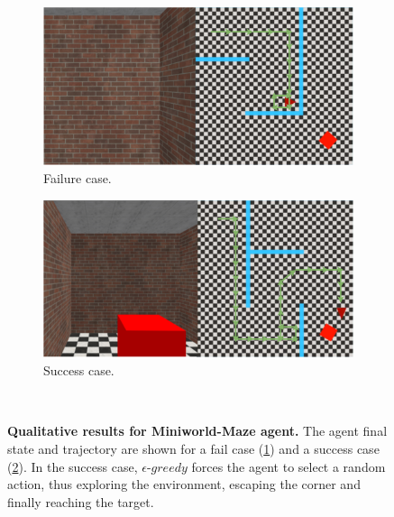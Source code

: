 \begin{figure}
    \centering
    \begin{subfigure}[b]{0.49\textwidth}
        \centering
        \includegraphics[width=\textwidth]{figures/understanding_vsn/qualitative_results/fail}
        \caption{Failure case.}
        \label{fig:maze_qualitative_fail}
    \end{subfigure}
    \hfill
    \begin{subfigure}[b]{0.49\textwidth}
        \centering
        \includegraphics[width=\textwidth]{figures/understanding_vsn/qualitative_results/success}
        \caption{Success case.}
        \label{fig:maze_qualitative_success}
    \end{subfigure}~\caption[Qualitative results for Miniworld-Maze agent]{\textbf{Qualitative results for Miniworld-Maze agent.} The agent final state and trajectory are shown for a fail case (\ref{fig:maze_qualitative_fail}) and a success case (\ref{fig:maze_qualitative_success}). In the success case, $\epsilon\text{-}greedy$ forces the agent to select a random action, thus exploring the environment, escaping the corner and finally reaching the target.}
    \label{fig:maze_qualitative}
\end{figure}

